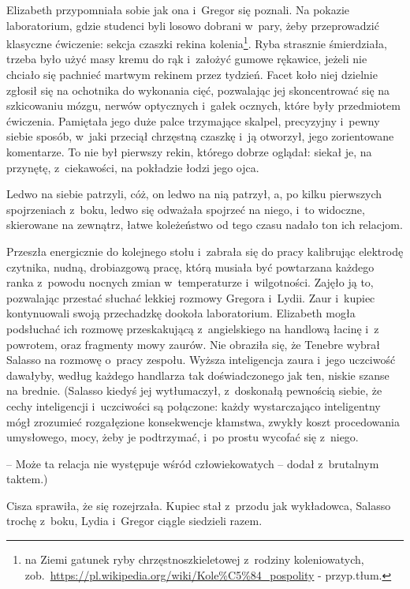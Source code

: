 \documentclass[oneside,polish,12pt,sfheadings]{mwbk}
\begin{document}
Elizabeth przypomniała sobie jak ona i~Gregor się poznali. Na pokazie
laboratorium, gdzie studenci byli losowo dobrani w~pary, żeby
przeprowadzić klasyczne ćwiczenie: sekcja czaszki rekina
kolenia\footnote{na Ziemi gatunek ryby
chrzęstnoszkieletowej z~rodziny koleniowatych, zob.~\url{https://pl.wikipedia.org/wiki/Kole\%C5\%84\_pospolity} - przyp.tłum.}.
Ryba strasznie śmierdziała, trzeba było użyć masy kremu do rąk i~założyć
gumowe rękawice, jeżeli nie chciało się pachnieć martwym rekinem przez
tydzień. Facet koło niej dzielnie zgłosił się na ochotnika do wykonania
cięć, pozwalając jej skoncentrować się na szkicowaniu mózgu, nerwów
optycznych i~gałek ocznych, które były przedmiotem ćwiczenia. Pamiętała
jego duże palce trzymające skalpel, precyzyjny i~pewny siebie sposób, w~jaki przeciął chrzęstną czaszkę i~ją otworzył, jego zorientowane
komentarze. To nie był pierwszy rekin, którego dobrze oglądał: siekał
je, na przynętę, z~ciekawości, na pokładzie łodzi jego ojca.

Ledwo na siebie patrzyli, cóż, on ledwo na nią patrzył, a, po kilku
pierwszych spojrzeniach z~boku, ledwo się odważała spojrzeć na niego, i~to widoczne, skierowane na zewnątrz, łatwe koleżeństwo od tego czasu
nadało ton ich relacjom.

Przeszła energicznie do kolejnego stołu i~zabrała się do pracy
kalibrując elektrodę czytnika, nudną, drobiazgową pracę, którą musiała
być powtarzana każdego ranka z~powodu nocnych zmian w~temperaturze i~wilgotności. Zajęło ją to, pozwalając przestać słuchać lekkiej rozmowy
Gregora i~Lydii. Zaur i~kupiec kontynuowali swoją przechadzkę dookoła
laboratorium. Elizabeth mogła podsłuchać ich rozmowę przeskakującą z~angielskiego na handlową łacinę i~z powrotem, oraz fragmenty mowy
zaurów. Nie obraziła się, że Tenebre wybrał Salasso na rozmowę o~pracy
zespołu. Wyższa inteligencja zaura i~jego uczciwość dawałyby, według
każdego handlarza tak doświadczonego jak ten, niskie szanse na brednie.
(Salasso kiedyś jej wytłumaczył, z~doskonałą pewnością siebie, że cechy
inteligencji i~uczciwości są połączone: każdy wystarczająco inteligentny
mógł zrozumieć rozgałęzione konsekwencje kłamstwa, zwykły koszt
procedowania umysłowego, mocy, żeby je podtrzymać, i~po prostu wycofać
się z~niego. 

-- Może ta relacja nie występuje wśród człowiekowatych --
dodał z~brutalnym taktem.)

Cisza sprawiła, że się rozejrzała. Kupiec stał z~przodu jak wykładowca,
Salasso trochę z~boku, Lydia i~Gregor ciągle siedzieli razem.
\end{document}
